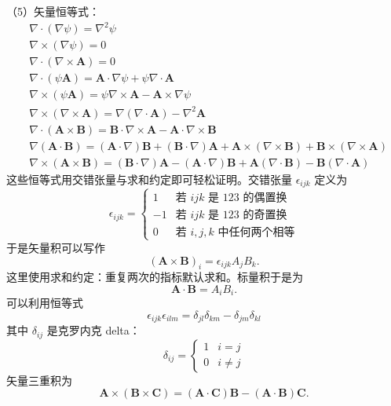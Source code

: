 （5）矢量恒等式：
\begin{align*}
&\nabla\cdot(\nabla\psi) = \nabla^{2}\psi\\
&\nabla\times(\nabla\psi) = 0\\
&\nabla\cdot(\nabla\times\mathbf{A}) = 0\\
&\nabla\cdot(\psi\mathbf{A}) = \mathbf{A}\cdot\nabla\psi+\psi\nabla\cdot\mathbf{A}\\
&\nabla\times(\psi\mathbf{A}) = \psi\nabla\times\mathbf{A}-\mathbf{A}\times\nabla\psi\\
&\nabla\times(\nabla\times\mathbf{A}) = \nabla(\nabla\cdot\mathbf{A})-\nabla^{2}\mathbf{A}\\
&\nabla\cdot(\mathbf{A}\times\mathbf{B}) = \mathbf{B}\cdot\nabla\times\mathbf{A}-\mathbf{A}\cdot\nabla\times\mathbf{B}\\
&\nabla(\mathbf{A}\cdot\mathbf{B}) = (\mathbf{A}\cdot\nabla)\mathbf{B}+(\mathbf{B}\cdot\nabla)\mathbf{A}+\mathbf{A}\times(\nabla\times\mathbf{B})+\mathbf{B}\times(\nabla\times\mathbf{A})\\
&\nabla\times(\mathbf{A}\times\mathbf{B}) = (\mathbf{B}\cdot\nabla)\mathbf{A}-(\mathbf{A}\cdot\nabla)\mathbf{B}+\mathbf{A}(\nabla\cdot\mathbf{B})-\mathbf{B}(\nabla\cdot\mathbf{A})
\end{align*}
这些恒等式用交错张量与求和约定即可轻松证明。交错张量 $\epsilon_{ijk}$ 定义为
\begin{equation*}
\epsilon_{ijk} = \begin{cases} 1 & \text{若 } ijk \text{ 是 } 123 \text{ 的偶置换}\\ -1 & \text{若 } ijk \text{ 是 } 123 \text{ 的奇置换}\\ 0 & \text{若 } i, j, k \text{ 中任何两个相等} \end{cases}
\end{equation*}
于是矢量积可以写作
\begin{equation*}
(\mathbf{A}\times\mathbf{B})_i = \epsilon_{ijk}A_jB_k.
\end{equation*}
这里使用求和约定：重复两次的指标默认求和。标量积于是为
\begin{equation*}
\mathbf{A}\cdot\mathbf{B} = A_iB_i.
\end{equation*}
可以利用恒等式
\begin{equation*}
\epsilon_{ijk}\epsilon_{ilm} = \delta_{jl}\delta_{km}-\delta_{jm}\delta_{kl}
\end{equation*}
其中 $\delta_{ij}$ 是克罗内克 delta：
\begin{equation*}
\delta_{ij} = \begin{cases} 1 & i=j\\ 0 & i\neq j \end{cases}
\end{equation*}
矢量三重积为
\begin{equation*}
\mathbf{A}\times(\mathbf{B}\times\mathbf{C}) = (\mathbf{A}\cdot\mathbf{C})\mathbf{B}-(\mathbf{A}\cdot\mathbf{B})\mathbf{C}.
\end{equation*}

